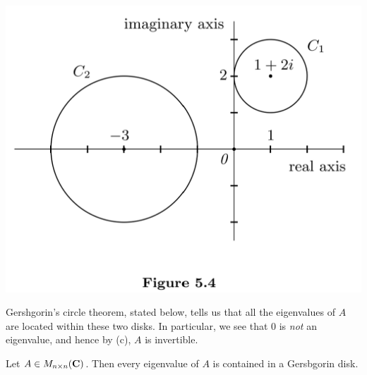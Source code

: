 \includegraphics[width=14cm]{images/figure-5-4.png}

Gershgorin's circle theorem, stated below, tells us that all the eigenvalues of \(A\) are located within these two disks.
In particular, we see that \(0\) is \emph{not} an eigenvalue, and hence by (c), \(A\) is invertible.

\begin{theorem}  \label{thm 5.15}
Let \(A \in M_{n \times n}(\mathbf{C})\).
Then every eigenvalue of \(A\) is contained in a Gersbgorin disk.
\end{theorem}

